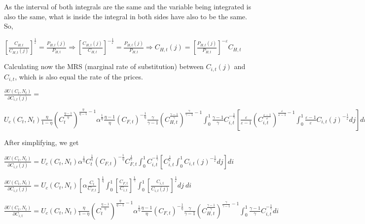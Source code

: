 \documentclass[
]{article}
\begin{document}
As the interval of both integrals are the same and the variable being
integrated is also the same, what is inside the integral in both sides
have also to be the same. So,

\(\displaystyle \left[\frac{C_{H,t}}{C_{H,t}(j)}\right]^{\frac{1}{\varepsilon}} = \frac{P_{H,t}(j)}{P_{H,t}} \Rightarrow \left[\frac{C_{H,t}(j)}{C_{H,t}}\right]^{-\frac{1}{\varepsilon}} = \frac{P_{H,t}(j)}{P_{H,t}} \Rightarrow C_{H,t}(j)= \left[ \frac{P_{H,t}(j)}{P_{H,t}} \right]^{-\varepsilon}C_{H,t}\)

Calculating now the MRS (marginal rate of substitution) between
\(C_{i,t}(j)\) and \(C_{i,t}\), which is also equal the rate of the
prices.

\(\displaystyle \frac{\partial U(C_t,N_t)}{\partial C_{i,t}(j)} =\)

\(\displaystyle U_c(C_t,N_t)\frac{\eta}{1-\eta}\left( C_t^{\frac{\eta-1}{\eta}} \right)^{\frac{\eta}{\eta-1}-1} \alpha^{\frac{1}{\eta}}\frac{\eta-1}{\eta}\left( C_{F,t}\right)^{-\frac{1}{\eta}}\frac{\gamma}{\gamma-1}\left(C_{H,t}^{\frac{\gamma-1}{\gamma}} \right)^{\frac{\gamma}{\gamma-1}-1}\int_0^1 \frac{\gamma-1}{\gamma} C_{i,t}^{-\frac{1}{\gamma}}\left[ \frac{\varepsilon}{\varepsilon-1}\left(C_{i,t}^{\frac{\varepsilon-1}{\varepsilon}} \right)^{\frac{\varepsilon}{\varepsilon-1}-1}\int_0^1 \frac{\varepsilon-1}{\varepsilon} C_{i,t}(j)^{-\frac{1}{\varepsilon}}dj \right]di\)

After simplifying, we get

\(\displaystyle \frac{\partial U(C_t,N_t)}{\partial C_{i,t}(j)} = U_c(C_t,N_t) \alpha^{\frac{1}{\eta}} C_t^{\frac{1}{\eta}}\left( C_{F,t}\right)^{-\frac{1}{\eta}}C_{F,t}^{\frac{1}{\gamma}} \int_0^1 C_{i,t}^{-\frac{1}{\gamma}} \left[ C_{i,t}^\frac{1}{\varepsilon} \int_0^1 C_{i,t}(j)^{-\frac{1}{\varepsilon}}dj \right] di\)

\(\displaystyle \frac{\partial U(C_t,N_t)}{\partial C_{i,t}(j)} = U_c(C_t,N_t) \left[ \alpha \frac{C_t}{C_{F,t}} \right]^{\frac{1}{\eta}} \int_0^1 \left[\frac{C_{F,t}}{C_{i,t}}\right]^{\frac{1}{\gamma}} \int_0^1 \left[\frac{C_{i,t}}{C_{i,t}(j)}\right]^{\frac{1}{\varepsilon}}dj \ di\)

\(\displaystyle \frac{\partial U(C_t,N_t)}{\partial C_{i,t}} = U_c(C_t,N_t)\frac{\eta}{1-\eta}\left( C_t^{\frac{\eta-1}{\eta}} \right)^{\frac{\eta}{\eta-1}-1} \alpha^{\frac{1}{\eta}}\frac{\eta-1}{\eta}\left( C_{F,t}\right)^{-\frac{1}{\eta}}\frac{\gamma}{\gamma-1}\left(C_{H,t}^{\frac{\gamma-1}{\gamma}} \right)^{\frac{\gamma}{\gamma-1}-1}\int_0^1 \frac{\gamma-1}{\gamma} C_{i,t}^{-\frac{1}{\gamma}}di\)
\end{document}
